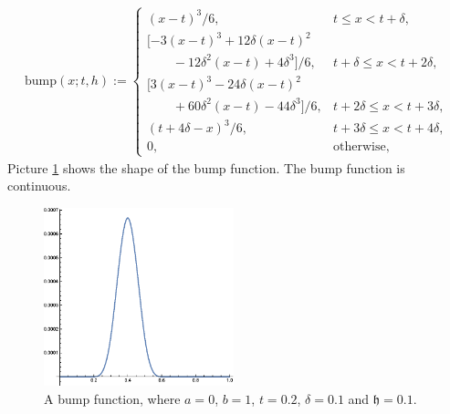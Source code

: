 \documentclass{iitthesis}
\theoremstyle{definition}
\theoremstyle{remark}
\begin{document}
\begin{align} \label{bumpfunction}
\text{bump}(x;t,h):= \begin{cases} \displaystyle (x-t)^3/6,  &t \le x < t+\delta,\\[1ex]
\displaystyle [-3(x-t)^3+12\delta(x-t)^2\\[1ex] \displaystyle\qquad -12\delta^2(x-t)+4\delta^3]/6,  &t+\delta \le x < t+2\delta,\\[1ex]
\displaystyle [3(x-t)^3-24\delta(x-t)^2\\[1ex]  \displaystyle\qquad +60\delta^2(x-t)-44\delta^3]/6, &t+2\delta \le x < t+3\delta,\\[1ex]
\displaystyle (t+4\delta-x)^3/6,  &t+3\delta \le x < t+4\delta,\\[1ex]
\displaystyle  0,  &\text{otherwise},
\end{cases}
\end{align}
Picture \ref{fig:bumpfunction} shows the shape of the bump function. The bump function is continuous.
\begin{figure}[ht]
\centering
\includegraphics[width=5.5cm]{bump.eps}
\caption{A bump function, where $a=0$, $b=1$, $t=0.2$, $\delta=0.1$ and $\mathfrak{h}=0.1$. \label{fig:bumpfunction}}
\end{figure}
\end{document}
